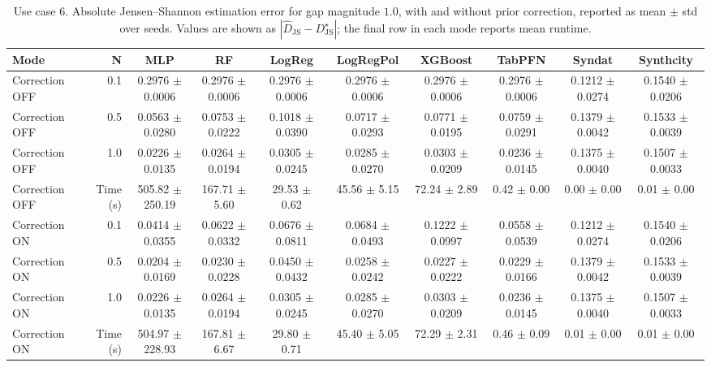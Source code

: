 \begin{table}[ht]
\centering
\scriptsize
\setlength{\tabcolsep}{2.5pt}
\caption{Use case 6. Absolute Jensen--Shannon estimation error for gap magnitude $1.0$, with and without prior correction, reported as mean $\pm$ std over seeds. Values are shown as $|\widehat{D}_{\mathrm{JS}} - D_{\mathrm{JS}}^{\star}|$; the final row in each mode reports mean runtime.}
\label{tab:uc6_gap_1p0_on_off_mean_std_from_seeds}
\begin{tabular}{lrcccccccc}
\toprule
Mode & N & MLP & RF & LogReg & LogRegPol & XGBoost & TabPFN & Syndat & Synthcity \\
\midrule
Correction OFF & 0.1 & 0.2976 $\pm$ 0.0006 & 0.2976 $\pm$ 0.0006 & 0.2976 $\pm$ 0.0006 & 0.2976 $\pm$ 0.0006 & 0.2976 $\pm$ 0.0006 & 0.2976 $\pm$ 0.0006 & 0.1212 $\pm$ 0.0274 & 0.1540 $\pm$ 0.0206 \\
Correction OFF & 0.5 & 0.0563 $\pm$ 0.0280 & 0.0753 $\pm$ 0.0222 & 0.1018 $\pm$ 0.0390 & 0.0717 $\pm$ 0.0293 & 0.0771 $\pm$ 0.0195 & 0.0759 $\pm$ 0.0291 & 0.1379 $\pm$ 0.0042 & 0.1533 $\pm$ 0.0039 \\
Correction OFF & 1.0 & 0.0226 $\pm$ 0.0135 & 0.0264 $\pm$ 0.0194 & 0.0305 $\pm$ 0.0245 & 0.0285 $\pm$ 0.0270 & 0.0303 $\pm$ 0.0209 & 0.0236 $\pm$ 0.0145 & 0.1375 $\pm$ 0.0040 & 0.1507 $\pm$ 0.0033 \\
Correction OFF & Time (s) & 505.82 $\pm$ 250.19 & 167.71 $\pm$ 5.60 & 29.53 $\pm$ 0.62 & 45.56 $\pm$ 5.15 & 72.24 $\pm$ 2.89 & 0.42 $\pm$ 0.00 & 0.00 $\pm$ 0.00 & 0.01 $\pm$ 0.00 \\
Correction ON & 0.1 & 0.0414 $\pm$ 0.0355 & 0.0622 $\pm$ 0.0332 & 0.0676 $\pm$ 0.0811 & 0.0684 $\pm$ 0.0493 & 0.1222 $\pm$ 0.0997 & 0.0558 $\pm$ 0.0539 & 0.1212 $\pm$ 0.0274 & 0.1540 $\pm$ 0.0206 \\
Correction ON & 0.5 & 0.0204 $\pm$ 0.0169 & 0.0230 $\pm$ 0.0228 & 0.0450 $\pm$ 0.0432 & 0.0258 $\pm$ 0.0242 & 0.0227 $\pm$ 0.0222 & 0.0229 $\pm$ 0.0166 & 0.1379 $\pm$ 0.0042 & 0.1533 $\pm$ 0.0039 \\
Correction ON & 1.0 & 0.0226 $\pm$ 0.0135 & 0.0264 $\pm$ 0.0194 & 0.0305 $\pm$ 0.0245 & 0.0285 $\pm$ 0.0270 & 0.0303 $\pm$ 0.0209 & 0.0236 $\pm$ 0.0145 & 0.1375 $\pm$ 0.0040 & 0.1507 $\pm$ 0.0033 \\
Correction ON & Time (s) & 504.97 $\pm$ 228.93 & 167.81 $\pm$ 6.67 & 29.80 $\pm$ 0.71 & 45.40 $\pm$ 5.05 & 72.29 $\pm$ 2.31 & 0.46 $\pm$ 0.09 & 0.01 $\pm$ 0.00 & 0.01 $\pm$ 0.00 \\
\bottomrule
\end{tabular}
\end{table}